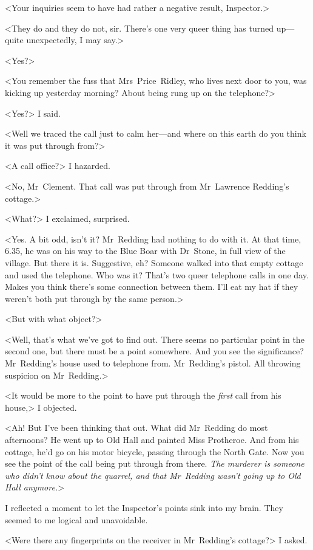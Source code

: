 <Your inquiries seem to have had rather a negative result, Inspector.>

<They do and they do not, sir. There's one very queer thing has turned up—quite unexpectedly, I may say.>

<Yes?>

<You remember the fuss that Mrs~Price~Ridley, who lives next door to you, was kicking up yesterday morning? About being rung up on the telephone?>

<Yes?> I said.

<Well we traced the call just to calm her—and where on this earth do you think it was put through from?>

<A call office?> I hazarded.

<No, Mr~Clement. That call was put through from Mr~Lawrence Redding's cottage.>

<What?> I exclaimed, surprised.

<Yes. A bit odd, isn't it? Mr~Redding had nothing to do with it. At that time, 6.35, he was on his way to the Blue Boar with Dr~Stone, in full view of the village. But there it is. Suggestive, eh? Someone walked into that empty cottage and used the telephone. Who was it? That's two queer telephone calls in one day. Makes you think there's some connection between them. I'll eat my hat if they weren't both put through by the same person.>

<But with what object?>

<Well, that's what we've got to find out. There seems no particular point in the second one, but there must be a point somewhere. And you see the significance? Mr~Redding's house used to telephone from. Mr~Redding's pistol. All throwing suspicion on Mr~Redding.>

<It would be more to the point to have put through the \emph{first} call from his house,> I objected.

<Ah! But I've been thinking that out. What did Mr~Redding do most afternoons? He went up to Old Hall and painted Miss Protheroe. And from his cottage, he'd go on his motor bicycle, passing through the North Gate. Now you see the point of the call being put through from there. \emph{The murderer is someone who didn't know about the quarrel, and that Mr~Redding wasn't going up to Old Hall anymore.}>

I reflected a moment to let the Inspector's points sink into my brain. They seemed to me logical and unavoidable.

<Were there any fingerprints on the receiver in Mr~Redding's cottage?> I asked.

